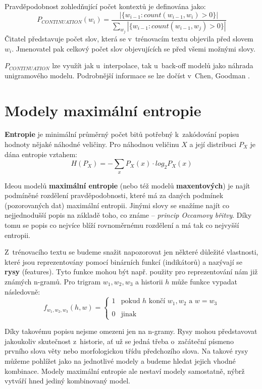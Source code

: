 \documentclass[12pt,a4paper]{report}
\begin{document}
Pravděpodobnost zohledňující počet kontextů je definována jako:
\begin{equation}
P_{CONTINUATION}(w_i) = \frac{|\{w_{i-1} : count(w_{i-1}, w_i) > 0 \}|}{\sum_{w_j} |\{w_{i-1} : count(w_{i-1}, w_j) > 0 \}|}
\end{equation}
Čitatel představuje počet slov, která se v~trénovacím textu objevila před slovem $w_i$. Jmenovatel pak celkový počet slov objevujících se před všemi možnými slovy.

$P_{CONTINUATION}$ lze využít jak u~interpolace, tak u~back-off modelů jako náhrada unigramového modelu. Podrobnější informace se lze dočíst v~Chen, Goodman \cite{chen}.

\section{Modely maximální entropie}

\textbf{Entropie} je minimální průměrný počet bitů potřebný k~zakódování popisu hodnoty nějaké náhodné veličiny. Pro náhodnou veličinu $X$ a její distribuci $P_X$ je dána entropie vztahem:
\begin{equation}\label{eq:entropy}
H(P_X) = - \sum_x P_X(x) \cdot log_2 P_X(x)
\end{equation}

Ideou modelů \textbf{maximální entropie} (nebo též modelů \textbf{maxentových}) je najít podmíněné rozdělení pravděpodobnosti, které má za daných podmínek (pozorovaných dat) maximální entropii. Jinými slovy se snažíme najít co nejjednodušší popis na základě toho, co známe -- \textit{princip Occamovy břitvy}. Díky tomu se popis co nejvíce blíží rovnoměrnému rozdělení a má tak co nejvyšší entropii.

Z~trénovacího textu se budeme snažit napozorovat jen některé důležité vlastnosti, které jsou reprezentovány pomocí binárních funkcí (indikátorů) a nazývají se \textbf{rysy} (features). Tyto funkce mohou být např. použity pro reprezentování nám již známých n-gramů. Pro trigram $w_1, w_2, w_3$ a historii $h$ může funkce vypadat následovně:
\begin{equation}
f_{w_1, w_2, w_3}(h,w) = \left\{
\begin{array}{ll}
1 & \text{pokud $h$ končí $w_1, w_2$ a $w = w_3$}\\
\\
0 & \text{jinak}
\end{array}\right.
\end{equation}

Díky takovému popisu nejsme omezeni jen na n-gramy. Rysy mohou představovat jakoukoliv skutečnost z~historie, ať už se jedná třeba o~začáteční písmeno prvního slova věty nebo morfologickou třídu předchozího slova. Na takové rysy můžeme pohlížet jako na jednotlivé modely a budeme hledat jejich vhodné kombinace. Modely maximální entropie ale nestaví modely samostatně, nýbrž vytváří hned jediný kombinovaný model.
\end{document}
